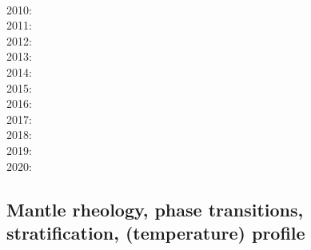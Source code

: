 {      \cite{brha09}\cite{scbs09b}\cite{oebm09}\\
2010: \cite{bumb10}\cite{detn10}\cite{yayh10}\cite{nata10}\cite{hole10}\cite{zhzl10}\cite{vayb10}
      \cite{brmw10}\\
2011: \cite{lowm11}\cite{rota11}\cite{woda11}\cite{lemj11}\cite{befa11}\cite{pewb11}\\
2012: \cite{bisa12}\cite{cort12b}\cite{deyt12}\cite{solo12}\cite{wele12}\\
2013: \cite{holj13}\cite{dadb13}\cite{toyd13}\cite{bogs13a}\cite{busa13}\cite{mika13}
      \cite{fabc13}\cite{cosr13}\cite{coml13}\cite{cost13}\cite{stha13}\cite{plth13}\cite{oflb13}\\
2014: \cite{arfw14}\cite{helo14}\cite{crta14}\cite{flgw14}\cite{roct14}\cite{cort14}\cite{becr14}
      \cite{nata14}\cite{stha14}\cite{stlh14}\\
2015: \cite{thkp15}\cite{wegg15}\cite{bect15}\\
2016: \cite{frbs16}\cite{sisc16}\cite{boba16}\cite{wele16}\cite{welm16}\cite{vade16}\cite{chah16}\\
2017: \cite{ghts17}\cite{civj17}\\
2018: \cite{cold18}\cite{arcf18}\cite{cosh18}\cite{wele18}\\
2019: \cite{gult19}\cite{mazh19}\cite{cohf19}\cite{lewh19}\cite{ulcw19}\cite{boba19}\cite{fube19}\\
2020: \cite{lalt20}
}

\subsection{Mantle rheology, phase transitions, stratification, (temperature) profile}

